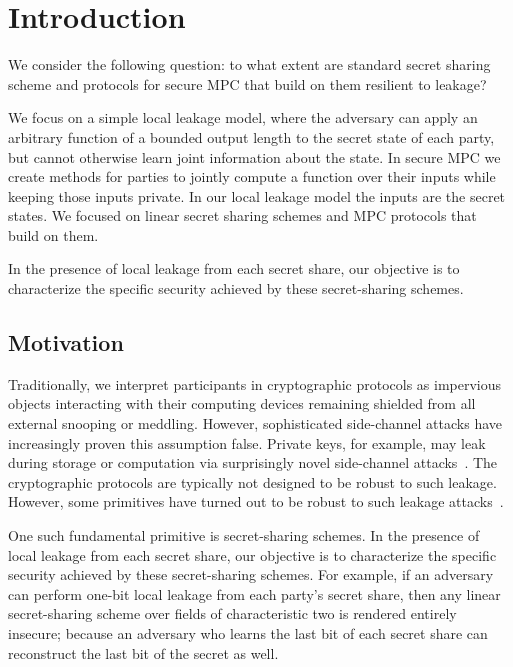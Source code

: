 \chapter{Introduction} %
\label{Chapter1}
We consider the following question: to what extent are standard secret sharing scheme and protocols for secure MPC that build on them resilient to leakage? 

We focus on a simple local leakage model, where the adversary can apply an arbitrary function of a bounded output length to the secret state of each party, but cannot otherwise learn joint information about the state. In secure MPC we create methods for parties to jointly compute a function over their inputs while keeping those inputs private. In our local leakage model the inputs are the secret states. We focused on linear secret sharing schemes and MPC protocols that build on them. 

In the presence of local leakage from each secret share, our objective is to characterize the specific security achieved by these secret-sharing schemes. 


\section {Motivation}

Traditionally, we interpret participants in cryptographic protocols as impervious objects interacting with their computing devices remaining shielded from all external snooping or meddling. 
However, sophisticated side-channel attacks have increasingly proven this assumption false. 
Private keys, for example, may leak during storage or computation via surprisingly novel side-channel attacks~\cite{USENIX:HSH+08}. 
The cryptographic protocols are typically not designed to be robust to such leakage. 
However, some primitives have turned out to be robust to such leakage attacks~\cite{C:BDIR18}. 

One such fundamental primitive is secret-sharing schemes. 
In the presence of local leakage from each secret share, our objective is to characterize the specific security achieved by these secret-sharing schemes. 
For example, if an adversary can perform one-bit local leakage from each party's secret share, then any linear secret-sharing scheme over fields of characteristic two is rendered entirely insecure; because an adversary who learns the last bit of each secret share can reconstruct the last bit of the secret as well. 

